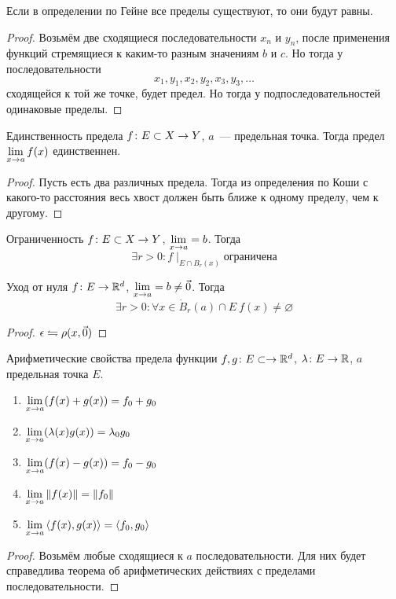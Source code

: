 \begin{Rem}
Если в определении по Гейне все пределы существуют, то они будут равны.
\end{Rem}
\begin{proof}
Возьмём две сходящиеся последовательности $x_n$ и $y_n$, после применения функций стремящиеся к каким-то разным значениям $b$ и $c$. Но тогда
у последовательности 
$$x_1, y_1, x_2, y_2, x_3, y_3, \ldots$$
сходящейся к той же точке, будет предел. Но тогда у подпоследовательностей одинаковые пределы.
\end{proof}

\begin{assertion}{Единственность предела}
$f\colon E \subset X \rightarrow Y$, $a$~--- предельная точка. Тогда предел $\lim\limits_{x\rightarrow a} f(x)$ единственнен.
\end{assertion}
\begin{proof}
Пусть есть два различных предела. Тогда из определения по Коши с какого-то расстояния весь хвост должен быть ближе к одному пределу, чем к другому.
\end{proof}

\begin{theorem}{Ограниченность}
$f\colon E \subset X \rightarrow Y$, $\lim\limits_{x\rightarrow a} = b$. Тогда 
$$\exists r>0\colon f \mid_{E \cap B_r(x)}\text{ограничена}$$
\end{theorem}

\begin{theorem}{Уход от нуля}
$f\colon E \rightarrow \mathbb{R}^d$, $\lim\limits_{x\rightarrow a} = b \ne \vec 0$. Тогда
$$\exists r>0\colon \forall x \in \dot B_r(a) \cap E\: f(x) \ne \varnothing$$
\end{theorem}
\begin{proof}
$\epsilon \leftrightharpoons \rho(x, \vec 0)$
\end{proof}

\begin{theorem}{Арифметические свойства предела функции}
$f, g\colon E \subset \rightarrow \mathbb{R}^d$, $\lambda\colon E \rightarrow \mathbb{R}$, $a$ предельная точка $E$.
\begin{enumerate}
\item $\lim\limits_{x\rightarrow a} (f(x) + g(x)) = f_0 + g_0$
\item $\lim\limits_{x\rightarrow a} (\lambda(x)  g(x)) = \lambda_0 g_0$
\item $\lim\limits_{x\rightarrow a} (f(x) - g(x)) = f_0 - g_0$
\item $\lim\limits_{x\rightarrow a} \left\|f(x)\right\| = \left\|f_0\right\|$
\item $\lim\limits_{x\rightarrow a} \left<f(x), g(x)\right> = \left<f_0, g_0\right>$
\end{enumerate}
\end{theorem}
\begin{proof}
Возьмём любые сходящиеся к $a$ последовательности. Для них будет справедлива теорема об арифметических действиях с пределами последовательности.
\end{proof}

